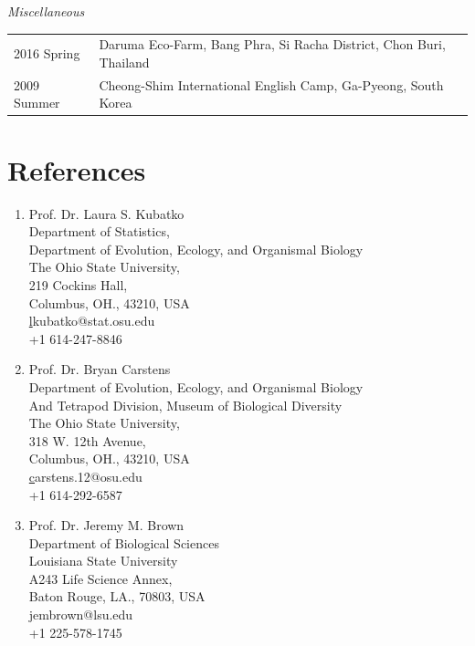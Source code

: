 \documentclass[11pt]{article}
\begin{document}
\textit{Miscellaneous}\\
\begin{longtable}{p{}  p{}}
2016 Spring & Daruma Eco-Farm, Bang Phra, Si Racha District, Chon Buri, Thailand\\
2009 Summer & Cheong-Shim International English Camp, Ga-Pyeong, South Korea\\
\end{longtable}
\hspace{0pt}


\pagebreak
\section*{References}

\begin{enumerate}

\item Prof. Dr. Laura S. Kubatko\\Department of Statistics,\\Department of Evolution, Ecology, and Organismal Biology\\The Ohio State University,\\219 Cockins Hall,\\Columbus, OH., 43210, USA\\\href{lkubatko@stat.osu.edu}lkubatko@stat.osu.edu\\+1 614-247-8846\\

\item Prof. Dr. Bryan Carstens\\ Department of Evolution, Ecology, and Organismal Biology\\ And Tetrapod Division, Museum of Biological Diversity\\The Ohio State University,\\318 W. 12th Avenue,\\Columbus, OH., 43210, USA\\\href{carstens.12@osu.edu}carstens.12@osu.edu\\+1 614-292-6587\\

\item Prof. Dr. Jeremy M. Brown\\ Department of Biological Sciences\\Louisiana State University\\ A243 Life Science Annex,\\ Baton Rouge, LA., 70803, USA\\\href{jembrown@lsu.edu}jembrown@lsu.edu\\ +1 225-578-1745
\\


\end{enumerate}
\end{document}
